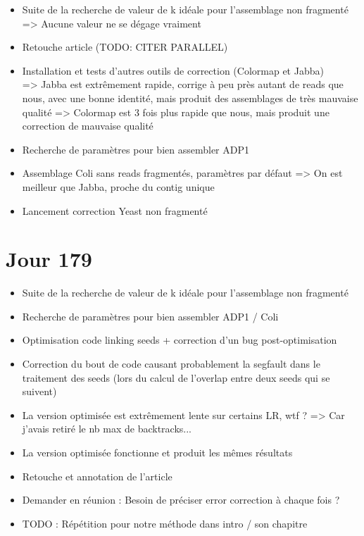 \documentclass[12pt]{report}
\begin{document}
\begin{itemize}
	\item Suite de la recherche de valeur de k idéale pour l'assemblage non fragmenté => Aucune valeur ne se dégage vraiment
	
	\item Retouche article (TODO: CITER PARALLEL)
	
	\item Installation et tests d'autres outils de correction (Colormap et Jabba) \\
		  => Jabba est extrêmement rapide, corrige à peu près autant de reads que nous, avec une bonne identité,
		  mais produit des assemblages de très mauvaise qualité
		  => Colormap est 3 fois plus rapide que nous, mais produit une correction de mauvaise qualité
	
	\item Recherche de paramètres pour bien assembler ADP1
	
	\item Assemblage Coli sans reads fragmentés, paramètres par défaut => On est meilleur que Jabba, proche du contig unique
	
	\item Lancement correction Yeast non fragmenté
\end{itemize}

\section{Jour 179}

\begin{itemize}
	\item Suite de la recherche de valeur de k idéale pour l'assemblage non fragmenté
	
	\item Recherche de paramètres pour bien assembler ADP1 / Coli
	
	\item Optimisation code linking seeds + correction d'un bug post-optimisation
	
	\item Correction du bout de code causant probablement la segfault dans le traitement des seeds (lors du calcul de l'overlap entre deux seeds
		  qui se suivent)
	
	\item La version optimisée est extrêmement lente sur certains LR, wtf ? => Car j'avais retiré le nb max de backtracks...
	
	\item La version optimisée fonctionne et produit les mêmes résultats
	
	\item Retouche et annotation de l'article
	
	\item Demander en réunion : Besoin de préciser error correction à chaque fois ?
	
	\item TODO : Répétition pour notre méthode dans intro / son chapitre
\end{itemize}
\end{document}
